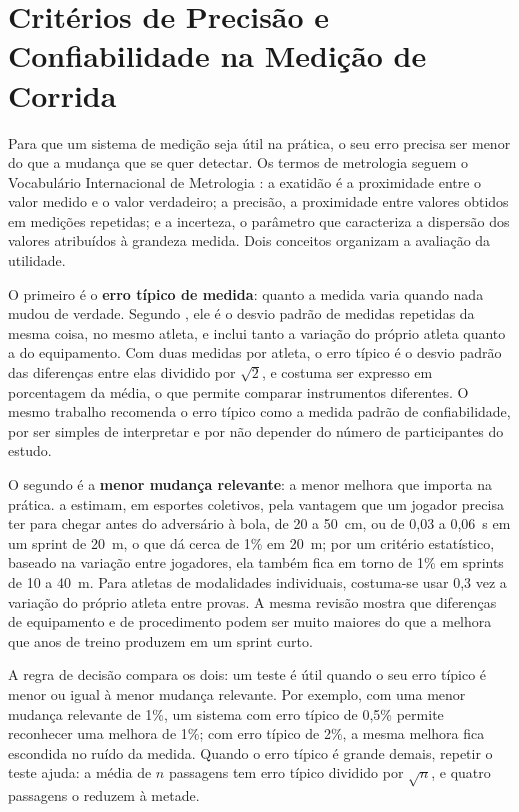 \documentclass[
    12pt,               %
    openright,          %
    twoside,            %
    a4paper,            %
    chapter=TITLE,      %
    english,            %
    brazil              %
    ]{abntex2}
\begin{document}
\section{Critérios de Precisão e Confiabilidade na Medição de Corrida}
\label{sec:criterios}

Para que um sistema de medição seja útil na prática, o seu erro precisa ser menor do que a mudança que se quer detectar. Os termos de metrologia seguem o Vocabulário Internacional de Metrologia \cite{jcgm2012vim}: a exatidão é a proximidade entre o valor medido e o valor verdadeiro; a precisão, a proximidade entre valores obtidos em medições repetidas; e a incerteza, o parâmetro que caracteriza a dispersão dos valores atribuídos à grandeza medida. Dois conceitos organizam a avaliação da utilidade.

O primeiro é o \textbf{erro típico de medida}: quanto a medida varia quando nada mudou de verdade. Segundo , ele é o desvio padrão de medidas repetidas da mesma coisa, no mesmo atleta, e inclui tanto a variação do próprio atleta quanto a do equipamento. Com duas medidas por atleta, o erro típico é o desvio padrão das diferenças entre elas dividido por $\sqrt{2}$, e costuma ser expresso em porcentagem da média, o que permite comparar instrumentos diferentes. O mesmo trabalho recomenda o erro típico como a medida padrão de confiabilidade, por ser simples de interpretar e por não depender do número de participantes do estudo.

O segundo é a \textbf{menor mudança relevante}: a menor melhora que importa na prática.  a estimam, em esportes coletivos, pela vantagem que um jogador precisa ter para chegar antes do adversário à bola, de 20 a 50~cm, ou de 0,03 a 0,06~s em um sprint de 20~m, o que dá cerca de 1\% em 20~m; por um critério estatístico, baseado na variação entre jogadores, ela também fica em torno de 1\% em sprints de 10 a 40~m. Para atletas de modalidades individuais, costuma-se usar 0,3 vez a variação do próprio atleta entre provas. A mesma revisão mostra que diferenças de equipamento e de procedimento podem ser muito maiores do que a melhora que anos de treino produzem em um sprint curto.

A regra de decisão compara os dois: um teste é útil quando o seu erro típico é menor ou igual à menor mudança relevante. Por exemplo, com uma menor mudança relevante de 1\%, um sistema com erro típico de 0,5\% permite reconhecer uma melhora de 1\%; com erro típico de 2\%, a mesma melhora fica escondida no ruído da medida. Quando o erro típico é grande demais, repetir o teste ajuda: a média de $n$ passagens tem erro típico dividido por $\sqrt{n}$, e quatro passagens o reduzem à metade.
\end{document}

